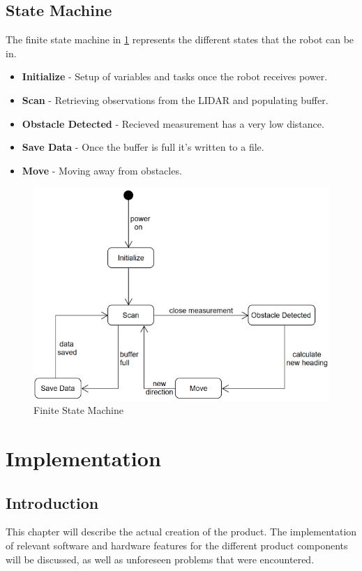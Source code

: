 		\section{State Machine}
		The finite state machine in \ref{fig:statemachine} represents the different states that the robot can be in.
		\begin{itemize}
			\item \textbf{Initialize} - Setup of variables and tasks once the robot receives power.
			\item \textbf{Scan} - Retrieving observations from the LIDAR and populating buffer.
			\item \textbf{Obstacle Detected} - Recieved measurement has a very low distance.
			\item \textbf{Save Data} - Once the buffer is full it's written to a file.
			\item \textbf{Move} - Moving away from obstacles.
		\end{itemize}
		
		\begin{figure}[ht]
			\centering
			\includegraphics[width=.8\linewidth]{SYNTHESIS/statemachine.png}
			\caption{Finite State Machine}
			\label{fig:statemachine}
		\end{figure}
		
	\chapter{Implementation}
		\section{Introduction}
		This chapter will describe the actual creation of the product. The implementation of relevant software and hardware features for the different product components will be discussed, as well as unforeseen problems that were encountered.
		
